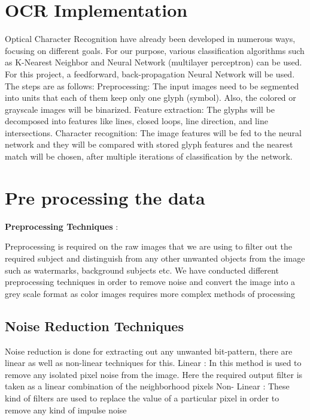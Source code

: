 \documentclass[9pt,twocolumn,twoside]{../../styles/osajnl}
\begin{document}
\section{OCR Implementation}

Optical Character Recognition have already been developed in numerous
ways, focusing on different goals. For our purpose, various
classification algorithms such as K-Nearest Neighbor and Neural
Network (multilayer perceptron) can be used. For this project, a
feedforward, back-propagation Neural Network will be used. The steps
are as follows: Preprocessing: The input images need to be segmented
into units that each of them keep only one glyph (symbol). Also, the
colored or grayscale images will be binarized.  Feature extraction:
The glyphs will be decomposed into features like lines, closed loops,
line direction, and line intersections.  Character recognition: The
image features will be fed to the neural network and they will be
compared with stored glyph features and the nearest match will be
chosen, after multiple iterations of classification by the network.

\section{Pre processing the data}


\textbf{Preprocessing Techniques} :

Preprocessing is required on the raw images that we are using to
filter out the required subject and distinguish from any other
unwanted objects from the image such as watermarks, background
subjects etc. We have conducted different preprocessing techniques in
order to remove noise and convert the image into a grey scale format
as color images requires more complex methods of processing

\subsection{ Noise Reduction Techniques}

Noise reduction is done for extracting out any unwanted bit-pattern,
there are linear as well as non-linear techniques for this.  Linear :
In this method is used to remove any isolated pixel noise from the
image. Here the required output filter is taken as a linear
combination of the neighborhood pixels Non- Linear : These kind of
filters are used to replace the value of a particular pixel in order
to remove any kind of impulse noise
\end{document}
